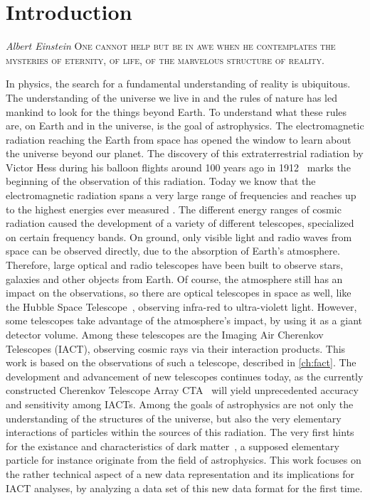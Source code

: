 \chapter{Introduction}
\nocite{biblatex, siunitx, Hunter:2007}%
%
\begin{aquote}{\textit{Albert Einstein}}
\textsc{One cannot help but be in awe when he contemplates the mysteries of eternity, of life, of the marvelous structure of reality.}
\end{aquote}
In physics, the search for a fundamental understanding of reality is ubiquitous. The understanding of the universe we live in and the rules of nature has
led mankind to look for the things beyond Earth. To understand what these rules
are, on Earth and in the universe, is the goal of astrophysics. The electromagnetic radiation reaching the Earth from space has opened the window to learn
about the universe beyond our planet. The discovery of this extraterrestrial
radiation by Victor Hess during his balloon flights around \num{100} years ago in \num{1912}~\cite{Hess} marks the beginning of the observation of this radiation.
Today we know that the electromagnetic radiation spans a very large range of
frequencies and reaches up to the highest energies ever measured \cite{source}.
The different energy ranges of cosmic radiation caused the development of a
variety of different telescopes, specialized on certain frequency bands. On
ground, only visible light and radio waves from space can be observed directly,
due to the absorption of Earth's atmosphere. Therefore, large optical and radio
telescopes have been built to observe stars, galaxies and other objects from
Earth. Of course, the atmosphere still has an impact on the observations, so
there are optical telescopes in space as well, like the Hubble Space
Telescope~\cite{hubble}, observing infra-red to ultra-violett light. However,
some telescopes take advantage of the atmosphere's impact, by using it as a
giant detector volume. Among these telescopes are the Imaging Air Cherenkov
Telescopes (IACT), observing cosmic rays via their interaction products. This
work is based on the observations of such a telescope, described in
\autoref{ch:fact}. The development and advancement of new telescopes continues
today, as the currently constructed Cherenkov Telescope Array CTA~\cite{cta}
will yield unprecedented accuracy and sensitivity among IACTs.
Among the goals of astrophysics are not only the understanding of the
structures of the universe, but also the very elementary interactions of
particles within the sources of this radiation. The very first hints for the
existance and characteristics of dark matter~\cite{zwicky}, a supposed
elementary particle for instance originate from the field of astrophysics.
This work focuses on the rather technical aspect of a new data representation
and its implications for IACT analyses, by analyzing a data set of this new data
format for the first time.
